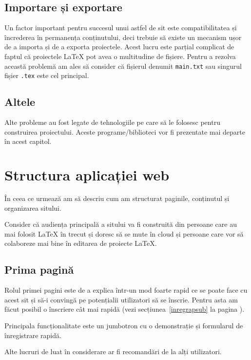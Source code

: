 \documentclass[a4wide,12pt]{report}
\newcommand{\eng}[1]{{#1}} %
\newcommand{\cod}[1]{\texttt{#1}}
\begin{document}
\subsection{Importare și exportare}

Un factor important pentru succesul unui astfel de sit este compatibilitatea și
încrederea în permanența conținutului, deci trebuie să existe un mecanism ușor
de a importa și de a exporta proiectele. Acest lucru este parțial complicat de
faptul că proiectele \LaTeX{} pot avea o multitudine de fișiere. Pentru a
rezolva această problemă am ales să consider că fișierul denumit \cod{main.txt}
sau singurul fișier \cod{.tex} este cel principal.

\subsection{Altele}

Alte probleme au fost legate de tehnologiile pe care să le folosesc pentru
construirea proiectului. Aceste programe/biblioteci vor fi prezentate mai departe
în acest capitol.

\section{Structura aplicației web}

În ceea ce urmează am să descriu cum am structurat paginile, conținutul și
organizarea sitului.

Consider că audiența principală a sitului va fi construită din persoane care au
mai folosit \LaTeX{} în trecut și doresc să se mute în \eng{cloud} și persoane
care vor să colaboreze mai bine în editarea de proiecte \LaTeX{}.

\subsection{Prima pagină}

Rolul primei pagini este de a explica într-un mod foarte rapid ce se poate face
cu acest sit și să-i convingă pe potențialii utilizatori să se înscrie. Pentru
asta am făcut posibil o înscriere cât mai rapidă (vezi
secțiunea~\ref{inregrapsub} la pagina \pageref{inregrapsub}).

Principala funcționalitate este un \eng{jumbotron} cu o demonstrație și
formularul de înregistrare rapidă.

Alte lucruri de luat în considerare ar fi recomandări de la alți utilizatori.
\end{document}
